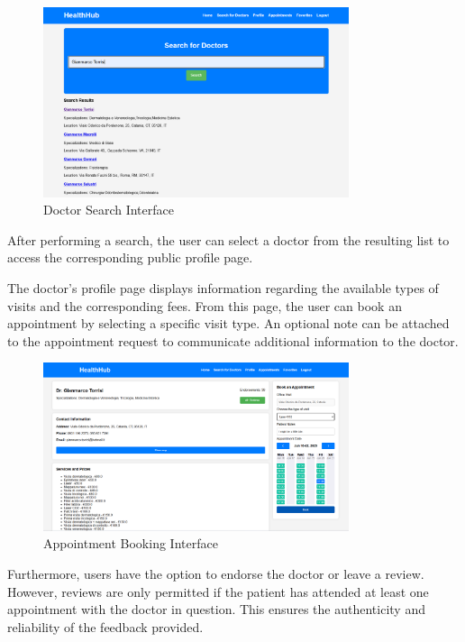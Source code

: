 \begin{figure}[H]
	\centering
	\includegraphics[width=0.8\textwidth]{resources/screenshots/patient_ui/search-doctor.png}
	\caption{Doctor Search Interface}
	\label{fig:search-doctor}
\end{figure}

After performing a search, the user can select a doctor from the resulting list to access the corresponding public profile page.

The doctor's profile page displays information regarding the available types of visits and the corresponding fees. From this page, the user can book an appointment by selecting a specific visit type. An optional note can be attached to the appointment request to communicate additional information to the doctor.

\begin{figure}[H]
	\centering
	\includegraphics[width=0.8\textwidth]{resources/screenshots/patient_ui/book-appointment.png}
	\caption{Appointment Booking Interface}
	\label{fig:book-appointment}
\end{figure}

Furthermore, users have the option to endorse the doctor or leave a review. However, reviews are only permitted if the patient has attended at least one appointment with the doctor in question. This ensures the authenticity and reliability of the feedback provided.

